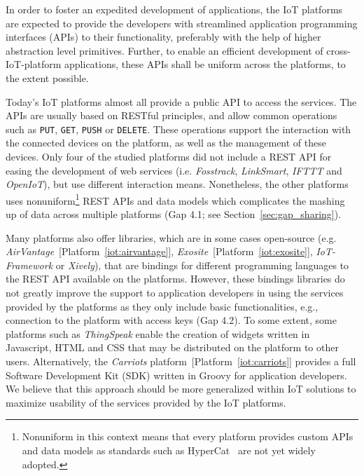 \documentclass[preprint,10pt,5p]{elsarticle}
\newcommand{\citeiot}[1]{[Platform~\ref{#1}]}
\begin{document}
In order to foster an expedited development of applications, 
the IoT platforms are expected to provide the developers with streamlined 
application programming interfaces (APIs) to their functionality, 
preferably with the help of higher abstraction level primitives. 
Further, to enable an efficient development of cross-IoT-platform applications, 
these APIs shall be uniform across the platforms, to the extent possible.

Today's IoT platforms almost all provide a public API to access the services.
The APIs are usually based on RESTful principles, 
and allow common operations such as \texttt{PUT}, \texttt{GET}, \texttt{PUSH} or \texttt{DELETE}. 
These operations support the interaction with the connected devices on the
platform, as well as the management of these devices. 
Only four of the studied platforms did not include a REST API for easing the
development of web services (i.e. \emph{Fosstrack},
\emph{LinkSmart\textsuperscript{\texttrademark}},
\emph{IFTTT} and \emph{OpenIoT}), but use different interaction means.
Nonetheless, the other platforms uses nonuniform\footnote{Nonuniform
  in this context means that every platform provides custom APIs and
  data models as standards such as HyperCat~\cite{Burt2014} are not
  yet widely adopted.} REST APIs and data models which complicates the
mashing up of data across multiple platforms (Gap 4.1; see 
Section~\ref{sec:gap_sharing}).

Many platforms also offer libraries, which are in some cases open-source (e.g.
\emph{AirVantage\textsuperscript{\texttrademark}}~\citeiot{iot:airvantage},
\emph{Exosite}~\citeiot{iot:exosite}, \emph{IoT-Framework} or
\emph{Xively}), that are bindings for different programming languages
to the REST API available on the platforms.
However, these bindings libraries do not greatly improve the support to
application developers in using the services provided by the platforms as they
only include basic functionalities, e.g., connection to the platform with access
keys (Gap 4.2).
To some extent, some platforms such as \emph{ThingSpeak} enable the creation of 
widgets written in Javascript, HTML and CSS that may be distributed on the
platform to other users.
Alternatively, the \emph{Carriots\textsuperscript{\textregistered}}
platform~\citeiot{iot:carriots} provides a full
Software Development Kit (SDK) written in Groovy for application developers. 
We believe that this approach should be more generalized within IoT solutions to
maximize usability of the services provided by the IoT platforms.
\end{document}

